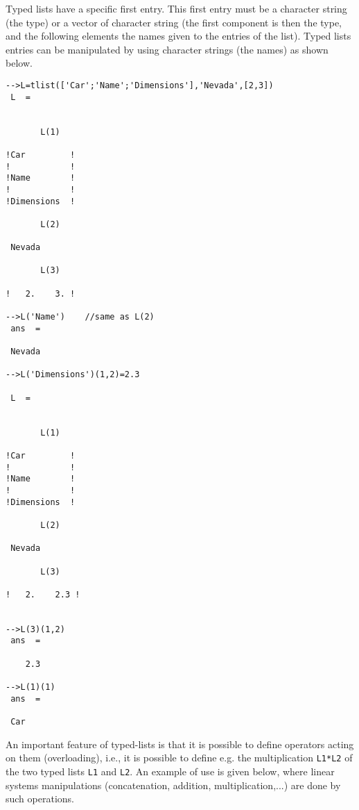 Typed lists have a specific first entry. This first entry must be a 
character string (the type) or a vector of character string (the first
component is then the type, and the following elements the names given
to the entries of the list). Typed lists entries can be manipulated
by using character strings (the names) as shown below.

\begin{verbatim}
-->L=tlist(['Car';'Name';'Dimensions'],'Nevada',[2,3])
 L  =
 
 
       L(1)
 
!Car         !
!            !
!Name        !
!            !
!Dimensions  !
 
       L(2)
 
 Nevada   
 
       L(3)
 
!   2.    3. !

-->L('Name')    //same as L(2)
 ans  =
 
 Nevada   
 
-->L('Dimensions')(1,2)=2.3

 L  =
 
 
       L(1)
 
!Car         !
!            !
!Name        !
!            !
!Dimensions  !
 
       L(2)
 
 Nevada   
 
       L(3)
 
!   2.    2.3 !
 

-->L(3)(1,2)
 ans  =
 
    2.3  

-->L(1)(1)
 ans  =
 
 Car
\end{verbatim}
An important feature of typed-lists is that it is possible to define
operators acting on them (overloading), i.e., it is possible
to define e.g. the multiplication \verb!L1*L2! of the two typed lists 
\verb!L1! and \verb!L2!. An example of use is given below, where
linear systems manipulations (concatenation, addition,
multiplication,...) are done by such operations.

